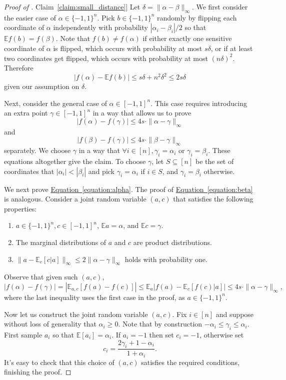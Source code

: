 \documentclass[11pt]{article}
\numberwithin{equation}{section}
\theoremstyle{definition}
\theoremstyle{plain}
\newcommand{\expref}[2]{\hyperref[#2]{#1~\ref{#2}}}
\newcommand{\expeqref}[2]{\hyperref[#2]{#1~\eqref{#2}}}
\newcommand{\E}{\mathbb{E}}
\begin{document}
\begin{proof}[Proof of \expref{Claim}{claim:small_distance}]
Let $\delta=\|\alpha-\beta\|_{\infty}$.
We first consider the easier case of $\alpha\in \{-1,1\}^n$.
Pick $b\in\{-1,1\}^n$ randomly by flipping each coordinate of $\alpha$ independently with probability $|\alpha_i-\beta_i|/2$ so that $\E f(b) = f(\beta)$. Note that $f(b) \neq f(\alpha)$ if either exactly one sensitive coordinate of $\alpha$ is flipped, which occurs with probability at most $s \delta$, or if at least two coordinates get flipped, which occurs with probability at most $(n \delta)^2$. Therefore
$$
|f(\alpha) - \E f(b) | \leq s \delta + n^2 \delta^2 \leq 2s \delta
$$
given our assumption on $\delta$.

Next, consider the general case of $\alpha \in [-1,1]^n$.
This case requires introducing an extra point $\gamma\in [-1,1]^n$ in a way that allows us to prove
\begin{equation}
\label{equation:alpha}
|f(\alpha) - f(\gamma)| \leq 4s\cdot \|\alpha -\gamma\|_\infty
\end{equation}
and
\begin{equation}
\label{equation:beta}
|f(\beta) - f(\gamma)| \leq 4s\cdot \|\beta -\gamma\|_\infty
\end{equation}
separately.
We choose $\gamma$ in a way that $\forall i \in [n], \gamma_i = \alpha_i$ or $\gamma_i = \beta_i$. These equations altogether give the claim.
To choose $\gamma$, let $S\subseteq [n]$ be the set of coordinates that $|\alpha_i| < |\beta_i|$ and pick $\gamma_i = \alpha_i$ if $i\in S$, and $\gamma_i = \beta_i$ otherwise.

We next prove \expeqref{Equation}{equation:alpha}.  The proof of \expeqref{Equation}{equation:beta} is analogous. Consider a joint random variable $(a,c)$ that satisfies the following properties:
\begin{enumerate}
\item  $a\in\{-1,1\}^n, c\in[-1,1]^n$, $\E a = \alpha$, and $\E c = \gamma$.
\item The marginal distributions of $a$ and $c$ are product distributions.
\item $\|a - \E_c[  c|a]\|_\infty \leq 2 \|\alpha-\gamma\|_\infty$ holds with probability one.
\end{enumerate}

Observe that given such $(a,c)$,
$$
|f(\alpha) - f(\gamma)| = |\E_{a,c} [f(a) - f(c)]| \le \E_{a} \left|f(a) - \E_c[f(c)|a] \right|\leq 4s\cdot \|\alpha -\gamma\|_\infty,
$$
where the last inequality uses the first case in the proof, as $a \in \{-1,1\}^n$.

Now let us construct the joint random variable $(a,c)$.
Fix  $i\in[n]$ and suppose without loss of generality that $\alpha_i \ge 0$.
Note that by construction $-\alpha_i \le \gamma_i \leq \alpha_i$. First sample $a_i$ so that $\E[a_i]=\alpha_i$.
If $a_i = -1$ then set $c_i=-1$, otherwise set
\[
  c_i = \frac{2\gamma_i + 1-\alpha_i}{1+\alpha_i}.
\]
It's easy to check that this choice of $(a,c)$ satisfies the required
conditions, finishing the proof.
\end{proof}
\end{document}

